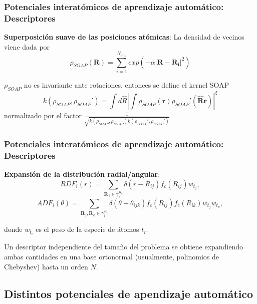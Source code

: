\documentclass[aspectratio=169]{beamer}
\let\oldtextbf\textbf
\renewcommand{\textbf}[1]{\textcolor{nordblue}{\oldtextbf{#1}}}
\begin{document}
    \begin{frame}
        \frametitle{Potenciales interatómicos de aprendizaje automático: Descriptores}

        \textbf{Superposición suave de las posiciones atómicas}: La densidad
        de vecinos viene dada por
        $$
        \rho_{SOAP}(\mathbf{R}) = \sum_{i=1}^{N_{env}} exp(-\alpha |\mathbf{R} - \mathbf{R_i}|^2)
        $$

        \pause

        $\rho_{SOAP}$ no es invariante ante rotaciones, entonces se define el 
        kernel SOAP
        $$
        k(\rho_{SOAP}, \rho_{SOAP}') = \int d\hat{R} \left|\int \rho_{SOAP}(\mathbf{r}) \rho_{SOAP}'(\mathbf{\hat{R}r})\right|^{\xi}
        $$
        normalizado por el factor $\frac{1}{\sqrt{k(\rho_{SOAP}, \rho_{SOAP}) k(\rho_{SOAP}', \rho_{SOAP}')}}$

    \end{frame}

    \begin{frame}
        \frametitle{Potenciales interatómicos de aprendizaje automático: Descriptores}

        \textbf{Expansión de la distribución radial/angular}:
        $$
        RDF_i(r) = \sum_{\mathbf{R}_j \in \gamma_i^{R_c}} \delta(r - R_{ij}) f_c(R_{ij}) w_{t_j},
        $$
        $$
        ADF_i(\theta) = \sum_{\mathbf{R}_j, \mathbf{R}_k \in \gamma_i^{R_c}} \delta(\theta - \theta_{ijk}) f_c(R_{ij}) f_c(R_{ik}) w_{t_j} w_{t_k},
        $$

        donde $w_{t_i}$ es el peso de la especie de átomos $t_i$.
        
        \pause

        Un descriptor independiente del tamaño del problema se obtiene expandiendo
        ambas cantidades en una base ortonormal (usualmente, polinomios de 
        Chebyshev) hasta un orden $N$.

    \end{frame}
    
    \subsection{Distintos potenciales de apendizaje automático}
\end{document}
